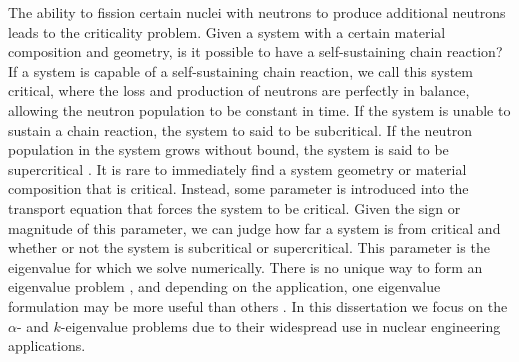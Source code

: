 The ability to fission certain nuclei with neutrons to produce additional neutrons leads to the criticality problem. Given a system with a certain material composition and geometry, is it possible to have a self-sustaining chain reaction? If a system is capable of a self-sustaining chain reaction, we call this system critical, where the loss and production of neutrons are perfectly in balance, allowing the neutron population to be constant in time. If the system is unable to sustain a chain reaction, the system to said to be subcritical. If the neutron population in the system grows without bound, the system is said to be supercritical \cite{bell_nuclear_1970}. It is rare to immediately find a system geometry or material composition that is critical. Instead, some parameter is introduced into the transport equation that forces the system to be critical. Given the sign or magnitude of this parameter, we can judge how far a system is from critical and whether or not the system is subcritical or supercritical. This parameter is the eigenvalue for which we solve numerically. There is no unique way to form an eigenvalue problem \cite{ronen_comparison_1976}, and depending on the application, one eigenvalue formulation may be more useful than others \cite{cacuci_eigenvalue-dependent_1982}. In this dissertation we focus on the $\alpha$- and $k$-eigenvalue problems due to their widespread use in nuclear engineering applications.

